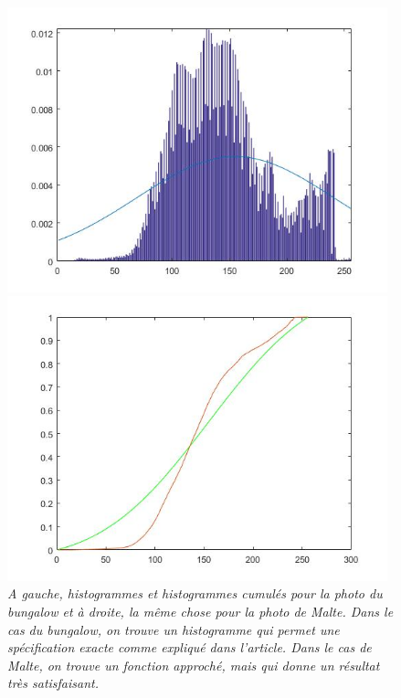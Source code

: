 \documentclass{article}
\begin{document}
\begin{figure}[!hbt]
\begin{minipage}{0.25\textwidth}
\end{minipage}%
\begin{minipage}{0.25\textwidth}
\centering
\includegraphics[width=0.98\textwidth]{images/p3_malta_hist.jpg}
\end{minipage}%
\begin{minipage}{0.25\textwidth}
\centering
\includegraphics[width=0.98\textwidth]{images/p3_malta_cumsum.jpg}
\end{minipage}
\caption{\textit{A gauche, histogrammes et histogrammes cumulés pour la photo du bungalow et à droite, la même chose pour la photo de Malte. Dans le cas du bungalow, on trouve un histogramme qui permet une spécification exacte comme expliqué dans l'article. Dans le cas de Malte, on trouve un fonction approché, mais qui donne un résultat très satisfaisant.}}
\label{fig:histograms}
\end{figure}
\end{document}
